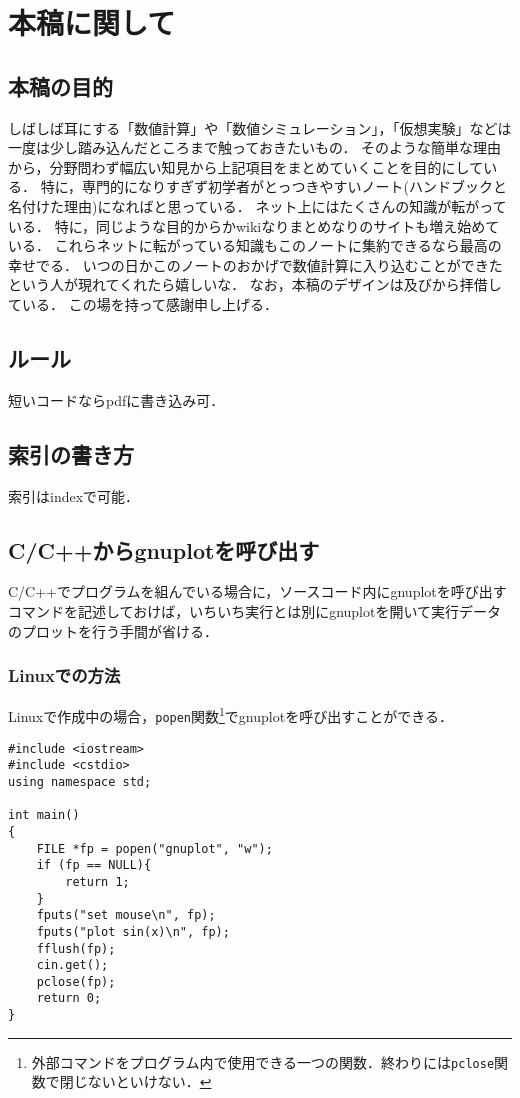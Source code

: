 \chapter{本稿に関して}

\section{本稿の目的}
しばしば耳にする「数値計算」や「数値シミュレーション」，「仮想実験」などは一度は少し踏み込んだところまで触っておきたいもの．
そのような簡単な理由から，分野問わず幅広い知見から上記項目をまとめていくことを目的にしている．
特に，専門的になりすぎず初学者がとっつきやすいノート(ハンドブックと名付けた理由)になればと思っている．
ネット上にはたくさんの知識が転がっている．
特に，同じような目的からかwikiなりまとめなりのサイトも増え始めている．
これらネットに転がっている知識もこのノートに集約できるなら最高の幸せでる．
いつの日かこのノートのおかげで数値計算に入り込むことができたという人が現れてくれたら嬉しいな．
なお，本稿のデザインは及びから拝借している．
この場を持って感謝申し上げる．

\section{ルール}
短いコードならpdfに書き込み可．



\section{索引の書き方}

索引はindexで可能．

\section{ C/C++からgnuplotを呼び出す}
C/C++でプログラムを組んでいる場合に，ソースコード内にgnuplotを呼び出すコマンドを記述しておけば，いちいち実行とは別にgnuplotを開いて実行データのプロットを行う手間が省ける．

\subsection{ Linuxでの方法}
Linuxで作成中の場合，\texttt{popen}関数\footnote{外部コマンドをプログラム内で使用できる一つの関数．終わりには\texttt{pclose}関数で閉じないといけない．}でgnuplotを呼び出すことができる．
\begin{lstlisting}[caption=C++のコード内からgnuplotを呼び出し$\sin x$を描く]
#include <iostream>
#include <cstdio>
using namespace std;

int main()
{
	FILE *fp = popen("gnuplot", "w");
	if (fp == NULL){
		return 1;
	}
	fputs("set mouse\n", fp);
	fputs("plot sin(x)\n", fp);
	fflush(fp);
	cin.get();
	pclose(fp);
	return 0;
}
\end{lstlisting}

